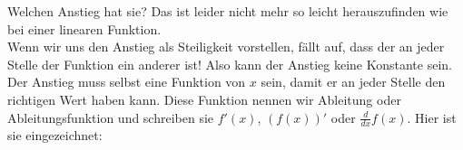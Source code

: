 \documentclass[a4paper, twocolumn]{article}
\begin{document}
\begin{small}
\begin{center}
\end{center}
Welchen Anstieg hat sie? Das ist leider nicht mehr so leicht herauszufinden wie bei einer linearen Funktion.\\
Wenn wir uns den Anstieg als Steiligkeit vorstellen, fällt auf, dass der an jeder Stelle der Funktion ein anderer ist! Also kann der Anstieg keine Konstante sein. Der Anstieg muss selbst eine Funktion von $x$ sein, damit er an jeder Stelle den richtigen Wert haben kann. Diese Funktion nennen wir Ableitung oder Ableitungsfunktion und schreiben sie $f'(x)$, $(f(x))'$ oder $\frac{d}{dx}f(x)$. Hier ist sie eingezeichnet:
\begin{center}
\end{center}
\end{small}
\end{document}
